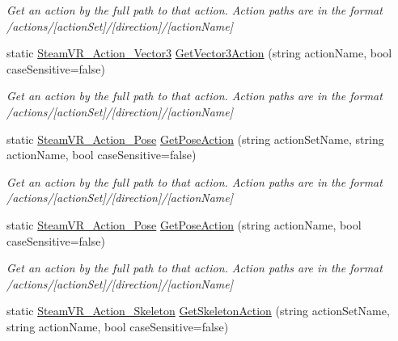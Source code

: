 \begin{DoxyCompactItemize}
\begin{DoxyCompactList}\small\item\em Get an action by the full path to that action. Action paths are in the format /actions/\mbox{[}action\+Set\mbox{]}/\mbox{[}direction\mbox{]}/\mbox{[}action\+Name\mbox{]} \end{DoxyCompactList}\item 
static \mbox{\hyperlink{class_valve_1_1_v_r_1_1_steam_v_r___action___vector3}{Steam\+V\+R\+\_\+\+Action\+\_\+\+Vector3}} \mbox{\hyperlink{class_valve_1_1_v_r_1_1_steam_v_r___input_add35bdec1632c00a3b3110f049e93129}{Get\+Vector3\+Action}} (string action\+Name, bool case\+Sensitive=false)
\begin{DoxyCompactList}\small\item\em Get an action by the full path to that action. Action paths are in the format /actions/\mbox{[}action\+Set\mbox{]}/\mbox{[}direction\mbox{]}/\mbox{[}action\+Name\mbox{]} \end{DoxyCompactList}\item 
static \mbox{\hyperlink{class_valve_1_1_v_r_1_1_steam_v_r___action___pose}{Steam\+V\+R\+\_\+\+Action\+\_\+\+Pose}} \mbox{\hyperlink{class_valve_1_1_v_r_1_1_steam_v_r___input_a356eb935355089208399a963fe717b66}{Get\+Pose\+Action}} (string action\+Set\+Name, string action\+Name, bool case\+Sensitive=false)
\begin{DoxyCompactList}\small\item\em Get an action by the full path to that action. Action paths are in the format /actions/\mbox{[}action\+Set\mbox{]}/\mbox{[}direction\mbox{]}/\mbox{[}action\+Name\mbox{]} \end{DoxyCompactList}\item 
static \mbox{\hyperlink{class_valve_1_1_v_r_1_1_steam_v_r___action___pose}{Steam\+V\+R\+\_\+\+Action\+\_\+\+Pose}} \mbox{\hyperlink{class_valve_1_1_v_r_1_1_steam_v_r___input_aa5711fcd08017cef2fd97a8eed2770a9}{Get\+Pose\+Action}} (string action\+Name, bool case\+Sensitive=false)
\begin{DoxyCompactList}\small\item\em Get an action by the full path to that action. Action paths are in the format /actions/\mbox{[}action\+Set\mbox{]}/\mbox{[}direction\mbox{]}/\mbox{[}action\+Name\mbox{]} \end{DoxyCompactList}\item 
static \mbox{\hyperlink{class_valve_1_1_v_r_1_1_steam_v_r___action___skeleton}{Steam\+V\+R\+\_\+\+Action\+\_\+\+Skeleton}} \mbox{\hyperlink{class_valve_1_1_v_r_1_1_steam_v_r___input_a3484935c1c72b595c5571659dee23f99}{Get\+Skeleton\+Action}} (string action\+Set\+Name, string action\+Name, bool case\+Sensitive=false)

\end{DoxyCompactItemize}
